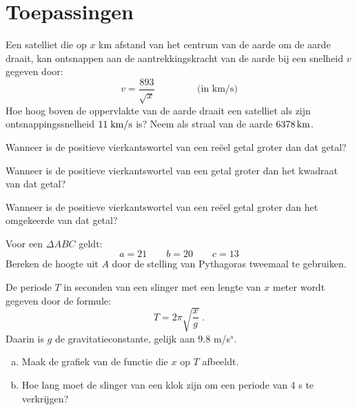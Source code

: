 \documentclass[12pt,twoside]{article}
\begin{document}
\pagebreak
\section{Toepassingen}

\begin{oefening} %
Een satelliet die op $x$ km afstand van het centrum van de aarde om de aarde draait, kan ontsnappen aan de aantrekkingskracht van de aarde bij een snelheid $v$ gegeven door:
$$v=\dfrac{893}{\sqrt{x}}\qquad\qquad\mbox{ (in km/s)}$$
Hoe hoog boven de oppervlakte van de aarde draait een satelliet als zijn ontsnappingssnelheid $11 \;\mbox{km/s}$ is? Neem als straal van de aarde $6378 \km$.
\end{oefening}

\begin{oefening} %
Wanneer is de positieve vierkantswortel van een reëel getal groter dan dat getal?
\end{oefening}

\begin{oefening} %
Wanneer is de positieve vierkantswortel van een getal groter dan het kwadraat van dat getal?
\end{oefening}

\begin{oefening} %
Wanneer is de positieve vierkantswortel van een reëel getal groter dan het omgekeerde van dat getal?
\end{oefening}


\begin{oefening} %
Voor een $\Delta ABC$ geldt:
$$a=21\qquad b=20\qquad c=13$$
Bereken de hoogte uit $A$ door de stelling van Pythagoras tweemaal te gebruiken.
\end{oefening}

\begin{oefening} %
De periode $T$ in seconden van een slinger met een lengte van $x$ meter wordt gegeven door de formule:
$$T=2\pi\sqrt{\dfrac{x}{g}}\;.$$
Daarin is $g$ de gravitatieconstante, gelijk aan $9.8$ m/s$^s$.
\begin{enumerate}[(a)]
  \item Maak de grafiek van de functie die $x$ op $T$ afbeeldt.
  \item Hoe lang moet de slinger van een klok zijn om een periode van 4 s te verkrijgen?
\end{enumerate}
\end{oefening}
\end{document}
